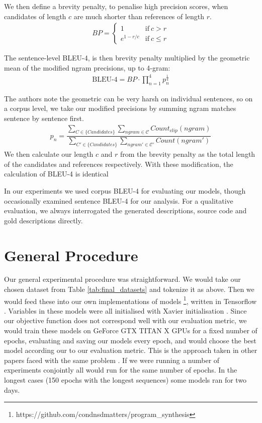 We then define a brevity penalty, to penalise high precision scores, when candidates of length $c$ are much shorter than references of length $r$.
\begin{align}
BP = \begin{cases}
      1 & \text{if}\ c > r \\
      e^{1-r/c} & \text{if}\ c \leq r
    \end{cases}\nonumber
\end{align}

The sentence-level BLEU-4, is then brevity penalty multiplied by the geometric mean of the modified ngram precisions, up to 4-gram:
\begin{align}
\text{BLEU-4} = BP\cdotp\prod_{n=1}^4 p_n^{\frac{1}{4}}
\end{align}

The authors note the geometric can be very harsh on individual sentences, so on a corpus level, we take our modified precisions by summing ngram matches sentence by sentence first.
\begin{align}
    p_n = \dfrac{
    \sum_{C \in \{Candidates\}}\sum_{ngram \in \mathcal{C}} Count_{clip}(ngram)}{
    \sum_{C' \in \{Candidates\}}\sum_{ngram' \in \mathcal{C'}} Count(ngram')} \nonumber 
\end{align}
We then calculate our length $c$ and $r$ from the brevity penalty as the total length of the candidates and references respectively.
With these modification, the calculation of BLEU-4 is identical

In our experiments we used corpus BLEU-4 for evaluating our models, though occasionally examined sentence BLEU-4 for our analysis. 
For a qualitative evaluation, we always interrogated the generated descriptions, source code and gold descriptions directly.


\section{General Procedure}
\label{sec:general_procedure}

Our general experimental procedure was straightforward. We would take our chosen dataset from Table \ref{tab:final_datasets} and  tokenize it as above. Then we would feed these into our own implementations of models
\footnote{https://github.com/condnsdmatters/program\_synthesis}, written in Tensorflow \citep{tensorflow2015-whitepaper}. Variables in these models were all initialised with Xavier initialisation \citep{glorot_understanding_nodate}. Since our objective function does not correspond well with our evaluation metric, we would train these models on GeForce GTX TITAN X GPUs for a fixed number of epochs, evaluating and saving our models every epoch, and would choose the best model according our to our evaluation metric. This is the approach taken in other papers faced with the same problem \citep{bahdanau_neural_2014,barone_parallel_2017}.  If we were running a number of experiments conjointly all would run for the same number of epochs. In the longest cases (150 epochs with the longest sequences) some models ran for two days.

